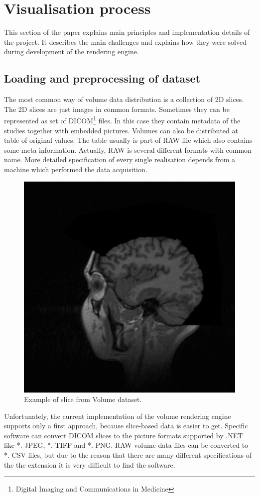 \documentclass[twoside, english, 11pt]{report}
\begin{document}
\section{Visualisation process}

This section of the paper explains main principles and implementation details of the project. It describes the main challenges and explains how they were solved during development of the rendering engine.

\subsection{Loading and preprocessing of dataset}
The most common way of volume data distribution is a collection of 2D slices. The 2D slices are just images in common formats. Sometimes they can be represented as set of DICOM\footnote{Digital Imaging and Communications in Medicine} files. In this case they contain metadata of the studies together with embedded pictures. Volumes can also be distributed at table of original values. The table usually is part of RAW file which also contains some meta information. Actually, RAW is several different formats with common name. More detailed specification of every single realisation depends from a machine which performed the data acquisition.\\
\begin{figure}[!h]
\centerline{\includegraphics[scale = 0.35]{img/slice}}
\caption{Example of slice from Volume dataset.\label{fig:slice}}
\end{figure}
Unfortunately, the current implementation of the volume rendering engine supports only a first approach, because slice-based data is easier to get. Specific software can convert DICOM slices to the picture formats supported by .NET like *. JPEG, *. TIFF and *. PNG. RAW volume data files can be converted to *. CSV files, but due to the reason that there are many different specifications of the the extension it is very difficult to find the software.\\
\end{document}
